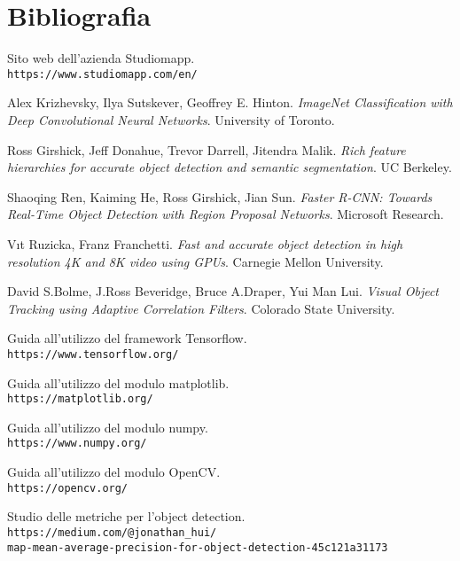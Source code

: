 \section{Bibliografia}

\begin{thebibliography}{99}

Sito web dell'azienda Studiomapp.
\\\texttt{https://www.studiomapp.com/en/}
 
Alex Krizhevsky, Ilya Sutskever, Geoffrey E. Hinton.
\textit{ImageNet Classification with Deep Convolutional
Neural Networks}. University of Toronto. 
 
Ross Girshick, Jeff Donahue, Trevor Darrell, Jitendra Malik.
\textit{Rich feature hierarchies for accurate object detection and semantic segmentation}. UC Berkeley. 
 
Shaoqing Ren, Kaiming He, Ross Girshick, Jian Sun.
\textit{Faster R-CNN: Towards Real-Time Object Detection
with Region Proposal Networks}. Microsoft Research.
 
Vıt Ruzicka, Franz Franchetti.
\textit{Fast and accurate object detection in high resolution 4K and 8K video using GPUs}. Carnegie Mellon University.

David S.Bolme, J.Ross Beveridge, Bruce A.Draper, Yui Man Lui.
\textit{Visual Object Tracking using Adaptive Correlation Filters}. Colorado State University.

Guida all'utilizzo del framework Tensorflow.
\\\texttt{https://www.tensorflow.org/}

Guida all'utilizzo del modulo matplotlib.
\\\texttt{https://matplotlib.org/}

Guida all'utilizzo del modulo numpy.
\\\texttt{https://www.numpy.org/}

Guida all'utilizzo del modulo OpenCV.
\\\texttt{https://opencv.org/}

Studio delle metriche per l'object detection.
\\\texttt{https://medium.com/@jonathan\_hui/\\
map-mean-average-precision-for-object-detection-45c121a31173}


\end{thebibliography}
